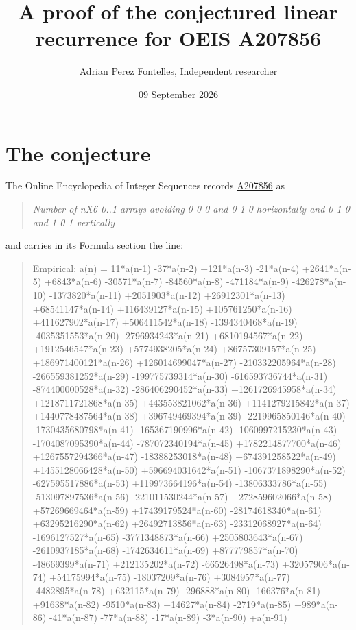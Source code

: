 \documentclass[11pt]{article}
\title{A proof of the conjectured linear recurrence for OEIS A207856}
\author{Adrian Perez Fontelles, Independent researcher}
\date{09 September 2026}
\theoremstyle{definition}
\begin{document}
\maketitle
\section{The conjecture}

The Online Encyclopedia of Integer Sequences records \href{https://oeis.org/A207856}{A207856} as

\begin{quote}\itshape Number of nX6 0..1 arrays avoiding 0 0 0 and 0 1 0 horizontally and 0 1 0 and 1 0 1 vertically\end{quote}

and carries in its Formula section the line:

\begin{quote}\ttfamily Empirical: a(n) = 11*a(n-1) -37*a(n-2) +121*a(n-3) -21*a(n-4) +2641*a(n-5) +6843*a(n-6) -30571*a(n-7) -84560*a(n-8) -471184*a(n-9) -426278*a(n-10) -1373820*a(n-11) +2051903*a(n-12) +26912301*a(n-13) +68541147*a(n-14) +116439127*a(n-15) +105761250*a(n-16) +411627902*a(n-17) +506411542*a(n-18) -1394340468*a(n-19) -4035351553*a(n-20) -2796934243*a(n-21) +6810194567*a(n-22) +1912546547*a(n-23) +5774938205*a(n-24) +86757309157*a(n-25) +186971400121*a(n-26) +126014699047*a(n-27) -210332205964*a(n-28) -266559381252*a(n-29) -199775739314*a(n-30) -616593736744*a(n-31) -874400000528*a(n-32) -286406290452*a(n-33) +1261726945958*a(n-34) +1218711721868*a(n-35) +443553821062*a(n-36) +1141279215842*a(n-37) +1440778487564*a(n-38) +396749469394*a(n-39) -2219965850146*a(n-40) -1730435680798*a(n-41) -165367190996*a(n-42) -1060997215230*a(n-43) -1704087095390*a(n-44) -787072340194*a(n-45) +1782214877700*a(n-46) +1267557294366*a(n-47) -18388253018*a(n-48) +674391258522*a(n-49) +1455128066428*a(n-50) +596694031642*a(n-51) -1067371898290*a(n-52) -627595517886*a(n-53) +119973664196*a(n-54) -13806333786*a(n-55) -513097897536*a(n-56) -221011530244*a(n-57) +272859602066*a(n-58) +57269669464*a(n-59) +17439179524*a(n-60) -28174618340*a(n-61) +63295216290*a(n-62) +26492713856*a(n-63) -23312068927*a(n-64) -1696127527*a(n-65) -3771348873*a(n-66) +2505803643*a(n-67) -2610937185*a(n-68) -1742634611*a(n-69) +877779857*a(n-70) -48669399*a(n-71) +212135202*a(n-72) -66526498*a(n-73) +32057906*a(n-74) +54175994*a(n-75) -18037209*a(n-76) +3084957*a(n-77) -4482895*a(n-78) +632115*a(n-79) -296888*a(n-80) -166376*a(n-81) +91638*a(n-82) -9510*a(n-83) +14627*a(n-84) -2719*a(n-85) +989*a(n-86) -41*a(n-87) -77*a(n-88) -17*a(n-89) -3*a(n-90) +a(n-91)\end{quote}
\end{document}
